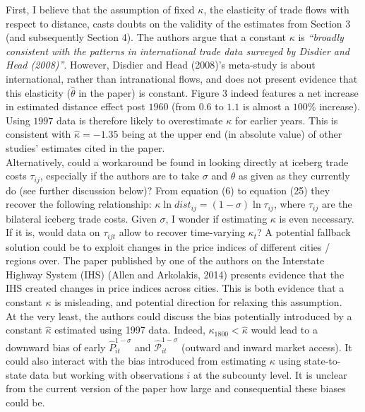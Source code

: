 \documentclass[12pt, final]{article}
\begin{document}
First, I believe that the assumption of fixed $\kappa$, the elasticity of trade flows with respect to distance, casts doubts on the validity of the estimates from Section 3 (and subsequently Section 4). 
The authors argue that a constant $\kappa$ is \textit{``broadly consistent with the patterns in international trade data surveyed by Disdier and Head (2008)''}. However, Disdier and Head (2008)'s meta-study is about international, rather than intranational flows, and does not present evidence that this elasticity ($\hat{\theta}$ in the paper) is constant. Figure 3 indeed features a net increase in estimated distance effect post $1960$ (from $0.6$ to $1.1$ is almost a $100 \%$ increase). Using $1997$ data is therefore likely to overestimate $\kappa$ for earlier years. This is consistent with $\hat{\kappa} = -1.35$ being at the upper end (in absolute value) of other studies' estimates cited in the paper. 
\\
Alternatively, could a workaround be found in looking directly at iceberg trade costs $\tau_{ij}$, especially if the authors are to take $\sigma$ and $\theta$ as given as they currently do (see further discussion below)?
From equation (6) to equation (25) they recover the following relationship: $ \kappa \ln dist_{ij} = (1 - \sigma) \ln \tau_{ij}$, where $\tau_{ij}$ are the bilateral iceberg trade costs. Given $\sigma$, I wonder if estimating $\kappa$ is even necessary. If it is, would data on $\tau_{ijt}$ allow to recover time-varying $\kappa_t$?
A potential fallback solution could be to exploit changes in the price indices of different cities / regions over. The paper published by one of the authors on the Interstate Highway System (IHS) (Allen and Arkolakis, 2014) presents evidence that the IHS created changes in price indices across cities. This is both evidence that a constant $\kappa$ is misleading, and potential direction for relaxing this assumption.
\\
At the very least, the authors could discuss the bias potentially introduced by a constant $\hat{\kappa}$ estimated using 1997 data.
Indeed, $\kappa_{1800} < \hat{\kappa}$ would lead to a downward bias of early $\hat{P}_{it}^{1-\sigma}$ and $\hat{\mathcal{P}}_{it}^{1-\sigma}$ (outward and inward market access). It could also interact with the bias introduced from estimating $\kappa$ using state-to-state data but working with observations $i$ at the subcounty level. It is unclear from the current version of the paper how large and consequential these biases could be.
\\ 
\end{document}
